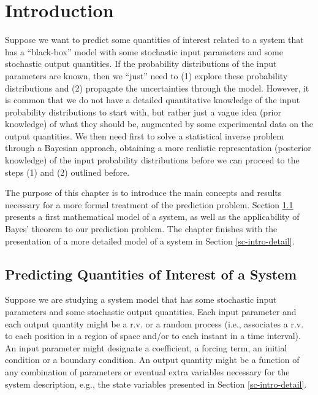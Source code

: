 \chapter{Introduction}\label{ch-int}
\thispagestyle{headings}

Suppose we want to predict some quantities of interest related to a system that
has a ``black-box'' model with
some stochastic input parameters and
some stochastic output quantities.
If the probability distributions of the input parameters are known, then we ``just'' need to
(1) explore these probability distributions and (2) propagate the uncertainties through the model.
However, it is common that we do not have a detailed quantitative knowledge of the input probability distributions to start with,
but rather just a vague idea (prior knowledge) of what they should be, augmented by some experimental data on the output quantities.
We then need first to solve a statistical inverse problem through a Bayesian approach, obtaining a more realistic representation
(posterior knowledge) of the input probability distributions before we can proceed to the steps (1) and (2) outlined before.

The purpose of this chapter is to introduce the main concepts and results necessary for
a more formal treatment of the prediction problem.
Section \ref{sc-intro-qoi} presents a first mathematical model of a system, as well as the applicability of Bayes' theorem to our prediction problem.
The chapter finishes with the presentation of a more detailed model of a system in Section \ref{sc-intro-detail}.

\section{Predicting Quantities of Interest of a System}\label{sc-intro-qoi}

Suppose we are studying a system model that has
some stochastic input parameters and some stochastic output quantities.
Each input parameter and each output quantity might be a r.v. or a random process
(i.e., associates a r.v. to each position in a region of space and/or to each instant in a time interval).
An input parameter might designate a coefficient, a forcing term, an initial condition or a boundary condition.
An output quantity might be a function of any combination of parameters or eventual extra variables necessary for the system description, e.g.,
the state variables presented in Section \ref{sc-intro-detail}.

